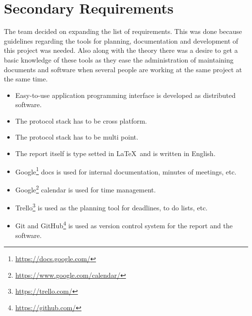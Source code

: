 \section{Secondary Requirements}
The team decided on expanding the list of requirements. This was done because guidelines regarding the tools for planning, documentation and development of this project was needed. 
Also along with the theory there was a desire to get a basic knowledge of these tools as they ease the administration of maintaining documents and software when several people are working at the same project at the same time.

\begin{itemize}
\item Easy-to-use application programming interface is developed as distributed software.
\item The protocol stack has to be cross platform.
\item The protocol stack has to be multi point.
\item The report itself is type setted in \LaTeX\ and is written in English.
\item Google\footnote{\url{https://docs.google.com/}} docs is used for internal documentation, minutes of meetings, etc.
\item Google\footnote{\url{https://www.google.com/calendar/}} calendar is used for time management.
\item Trello\footnote{\url{https://trello.com/}} is used as the planning tool for deadlines, to do lists, etc.
\item Git and GitHub\footnote{\url{https://github.com/}} is used as version control system for the report and the software.
\end{itemize}

